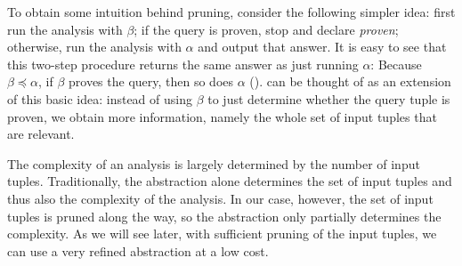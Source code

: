 To obtain some intuition behind pruning,
consider the following simpler idea:
first run the analysis with $\beta$; if the query is proven, stop and declare {\em proven}; otherwise, run the analysis
with $\alpha$ and output that answer.
It is easy to see that this two-step procedure returns the same answer as just running $\alpha$:
Because $\beta \preceq \alpha$, if $\beta$ proves the query, then so does $\alpha$
().
 can be thought of as an extension of this basic idea:
instead of using $\beta$ to just determine whether the query tuple is proven,
we obtain more information, namely the whole set of input tuples that are relevant.

The complexity of an analysis is largely determined by the number of input
tuples.  Traditionally, the abstraction alone determines the set of input
tuples and thus also the complexity of the analysis.  In our case, however, the set
of input tuples is pruned along the way, so the abstraction only partially
determines the complexity.  As we will see later, with sufficient pruning of
the input tuples, we can use a very refined abstraction at a low cost.


